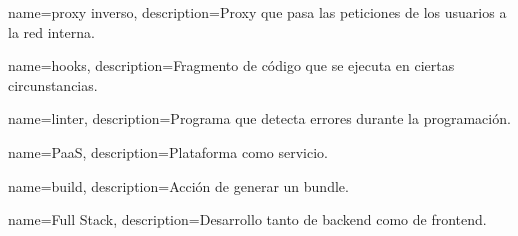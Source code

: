 {
name={proxy inverso},
description={Proxy que pasa las peticiones de los usuarios a la red interna.}
}

{
name={hooks},
description={Fragmento de código que se ejecuta en ciertas circunstancias.}
}

{
name={linter},
description={Programa que detecta errores durante la programación.}
}

{
name={PaaS},
description={Plataforma como servicio.}
}

{
name={build},
description={Acción de generar un bundle.}
}

{
name={Full Stack},
description={Desarrollo tanto de backend como de frontend.}
}
